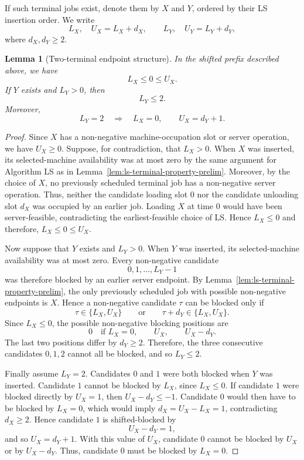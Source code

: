 \documentclass[11pt]{article}
\newtheorem{lemma}[theorem]{Lemma}
\begin{document}
If such terminal jobs exist, denote them by \(X\) and \(Y\), ordered by their LS
insertion order. We write
\[
        L_X,\quad U_X=L_X+d_X,
        \qquad
        L_Y,\quad U_Y=L_Y+d_Y,
\]
where \(d_X,d_Y\ge2\).

\begin{lemma}[Two-terminal endpoint structure]
\label{lem:two-terminal-endpoint-three}
In the shifted prefix described above, we have
\[
        L_X\le0\le U_X .
\]
If \(Y\) exists and \(L_Y>0\), then
\[
        L_Y\le2 .
\]
Moreover,
\[
        L_Y=2
        \quad\Longrightarrow\quad
        L_X=0,\qquad U_X=d_Y+1 .
\]
\end{lemma}

\begin{proof}
Since \(X\) has a non-negative machine-occupation slot or server operation, we
have \(U_X\ge0\). Suppose, for contradiction, that \(L_X>0\). When \(X\) was
inserted, its selected-machine availability was at most zero by the same 
argument for Algorithm LS as in Lemma~\ref{lem:ls-terminal-property-prelim}. Moreover, by the
choice of \(X\), no previously scheduled terminal job has a non-negative server operation.
Thus, neither the candidate loading slot \(0\) nor the candidate unloading slot
\(d_X\) was occupied by an earlier job. Loading \(X\) at time \(0\) would have
been server-feasible, contradicting the earliest-feasible choice of LS. Hence
\(L_X\le0\) and therefore, \(L_X\le0\le U_X\).

Now suppose that \(Y\) exists and \(L_Y>0\). When \(Y\) was inserted, its
selected-machine availability was at most zero. Every non-negative candidate
\[
        0,1,\ldots,L_Y-1
\]
was therefore blocked by an earlier server endpoint. By
Lemma~\ref{lem:ls-terminal-property-prelim}, the only previously scheduled job with possible
non-negative endpoints is \(X\). Hence a non-negative candidate \(\tau\) can be
blocked only if
\[
        \tau\in\{L_X,U_X\}
        \qquad\text{or}\qquad
        \tau+d_Y\in\{L_X,U_X\}.
\]
Since \(L_X\le0\), the possible non-negative blocking positions are
\[
        0 \quad\text{if }L_X=0,\qquad U_X,\qquad U_X-d_Y .
\]
The last two positions differ by \(d_Y\ge2\). Therefore, the three consecutive
candidates \(0,1,2\) cannot all be blocked, and so \(L_Y\le2\).

Finally assume \(L_Y=2\). Candidates \(0\) and \(1\) were both blocked when
\(Y\) was inserted. Candidate \(1\) cannot be blocked by \(L_X\), since
\(L_X\le0\). If candidate \(1\) were blocked directly by \(U_X=1\), then
\(U_X-d_Y\le -1\). Candidate \(0\) would then have to be blocked by \(L_X=0\),
which would imply \(d_X=U_X-L_X=1\), contradicting \(d_X\ge2\). Hence candidate
\(1\) is shifted-blocked by
\[
        U_X-d_Y=1,
\]
and so \(U_X=d_Y+1\). With this value of \(U_X\), candidate \(0\) cannot be
blocked by \(U_X\) or by \(U_X-d_Y\). Thus, candidate \(0\) must be blocked by
\(L_X=0\).
\end{proof}
\end{document}
